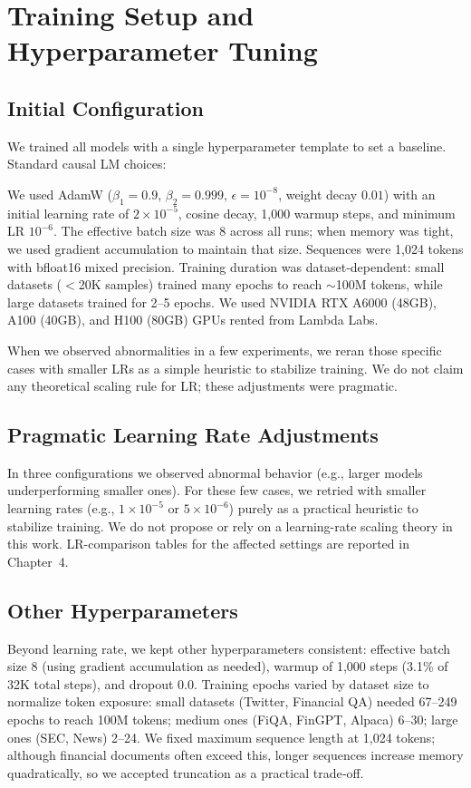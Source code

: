 \section{Training Setup and Hyperparameter Tuning}

\subsection{Initial Configuration}

We trained all models with a single hyperparameter template to set a baseline. Standard causal LM choices:

We used AdamW ($\beta_1=0.9$, $\beta_2=0.999$, $\epsilon=10^{-8}$, weight decay $0.01$) with an initial learning rate of $2\times10^{-5}$, cosine decay, 1{,}000 warmup steps, and minimum LR $10^{-6}$. The effective batch size was 8 across all runs; when memory was tight, we used gradient accumulation to maintain that size. Sequences were 1{,}024 tokens with bfloat16 mixed precision. Training duration was dataset‑dependent: small datasets ($<$20K samples) trained many epochs to reach $\sim$100M tokens, while large datasets trained for 2–5 epochs. We used NVIDIA RTX A6000 (48GB), A100 (40GB), and H100 (80GB) GPUs rented from Lambda Labs.

When we observed abnormalities in a few experiments, we reran those specific cases with smaller LRs as a simple heuristic to stabilize training. We do not claim any theoretical scaling rule for LR; these adjustments were pragmatic.

\subsection{Pragmatic Learning Rate Adjustments}

In three configurations we observed abnormal behavior (e.g., larger models underperforming smaller ones). For these few cases, we retried with smaller learning rates (e.g., $1\times 10^{-5}$ or $5\times 10^{-6}$) purely as a practical heuristic to stabilize training. We do not propose or rely on a learning-rate scaling theory in this work. LR-comparison tables for the affected settings are reported in Chapter~4.

\subsection{Other Hyperparameters}

Beyond learning rate, we kept other hyperparameters consistent: effective batch size 8 (using gradient accumulation as needed), warmup of 1{,}000 steps (3.1\% of 32K total steps), and dropout 0.0. Training epochs varied by dataset size to normalize token exposure: small datasets (Twitter, Financial QA) needed 67–249 epochs to reach 100M tokens; medium ones (FiQA, FinGPT, Alpaca) 6–30; large ones (SEC, News) 2–24. We fixed maximum sequence length at 1{,}024 tokens; although financial documents often exceed this, longer sequences increase memory quadratically, so we accepted truncation as a practical trade‑off.

